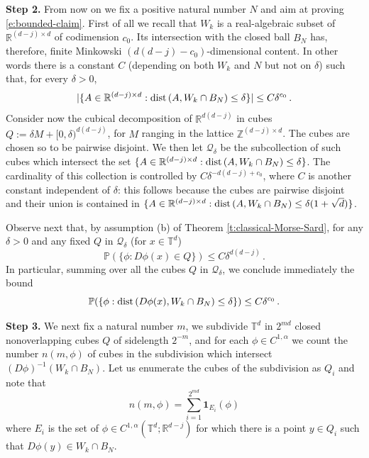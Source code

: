 \documentclass[11pt,reqno]{amsart}
\theoremstyle{definition}
\numberwithin{equation}{section}
\begin{document}
\medskip

{\bf Step 2.} From now on we fix a positive natural number $N$ and aim at proving \eqref{e:bounded-claim}. First of all we recall that $W_k$ is a real-algebraic subset of $\mathbb R^{(d-j)\times d}$ of codimension $c_0$. Its intersection with the closed ball $B_N$ has, therefore, finite Minkowski $(d (d-j)-c_0)$-dimensional content. In other words there is a constant $C$ (depending on both $W_k$ and $N$ but not on $\delta$) such that, for every $\delta>0$, 
\[
|\{ A \in \mathbb{R}^{(d-j)\times d} : {\rm dist}\, (A, W_k \cap B_N)  \leq \delta\}|\leq C \delta^{c_0}\, .
\]
Consider now the cubical decomposition of $\mathbb R^{d(d-j)}$ in cubes $Q:= \delta M + [0, \delta)^{d(d-j)}$, for $M$ ranging in the lattice $\mathbb Z^{(d-j)\times d}$. The cubes are chosen so to be pairwise disjoint. We then let $\mathcal{Q}_\delta$ be the subcollection of such cubes which intersect the set $\{ A \in \mathbb{R}^{(d-j)\times d} :{\rm dist}\, (A, W_k\cap B_N) \leq \delta\}$. The cardinality of this collection is controlled by $C \delta^{-d(d-j)+c_0}$, where $C$ is another constant independent of $\delta$: this follows because the cubes are pairwise disjoint and their union is contained in $\{ A \in \mathbb{R}^{(d-j)\times d} :{\rm dist}\, (A, W_k \cap B_N) \leq \delta (1+\sqrt{d})\}$.

Observe next that, by assumption (b) of Theorem \ref{t:classical-Morse-Sard}, for any $\delta>0$ and any fixed $Q$ in $\mathcal{Q}_\delta$ (for $x \in \mathbb{T}^d$)
\[
\mathbb{P} (\{\phi: D\phi (x)\in Q\}) \leq C \delta^{d(d-j)} \, . 
\]
In particular, summing over all the cubes $Q$ in $\mathcal{Q}_\delta$, we conclude immediately the bound
\begin{equation}\label{e:first-probability-bound}
\mathbb{P} (\{\phi: {\rm dist}\, (D\phi (x), W_k\cap B_N) \leq \delta\}) \leq C \delta^{c_0}\, .
\end{equation}

\medskip

{\bf Step 3.} We next fix a natural number $m$, we subdivide $\mathbb T^d$ in $2^{m d}$ closed nonoverlapping cubes $Q$ of sidelength $2^{- m}$, and for each $\phi\in C^{1,\alpha}$ we count the number $n( m,\phi)$ of cubes in the subdivision which intersect $(D\phi)^{-1} ( W_k \cap B_N)$. Let us enumerate the cubes of the subdivision as $Q_i$ and note that
\begin{equation}\label{e:hits}
n( m,\phi) = \sum_{i=1}^{2^{m d}} \mathbf{1}_{E_i} (\phi)
\end{equation}
where $E_i$ is the set of $\phi\in C^{1,\alpha} (\mathbb{T}^d ; \mathbb{R}^{d-j})$ for which there is a point $y\in Q_i$ such that $D\phi (y)\in W_k\cap B_N$.
\end{document}
